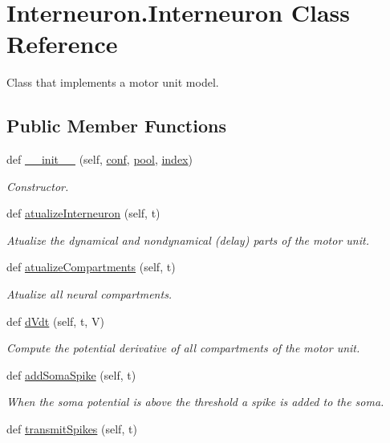 \hypertarget{class_interneuron_1_1_interneuron}{}\section{Interneuron.\+Interneuron Class Reference}
\label{class_interneuron_1_1_interneuron}


Class that implements a motor unit model.  


\subsection*{Public Member Functions}
\begin{DoxyCompactItemize}
\item 
def \hyperlink{class_interneuron_1_1_interneuron_a9550e1a9e62f415679fc7710db5c2a65}{\+\_\+\+\_\+init\+\_\+\+\_\+} (self, \hyperlink{class_interneuron_1_1_interneuron_a20078e4de62213b832ce7f1cf2c587c7}{conf}, \hyperlink{class_interneuron_1_1_interneuron_acc2d5c89c20fc2db87f7af1839069127}{pool}, \hyperlink{class_interneuron_1_1_interneuron_ab8834528a49b8be56d59e0afc97019c2}{index})
\begin{DoxyCompactList}\small\item\em Constructor. \end{DoxyCompactList}\item 
def \hyperlink{class_interneuron_1_1_interneuron_aaa557573420679f62247b6c6a3879f88}{atualize\+Interneuron} (self, t)
\begin{DoxyCompactList}\small\item\em Atualize the dynamical and nondynamical (delay) parts of the motor unit. \end{DoxyCompactList}\item 
def \hyperlink{class_interneuron_1_1_interneuron_aadb0a11834ebf0b9fb0fa05788da23d1}{atualize\+Compartments} (self, t)
\begin{DoxyCompactList}\small\item\em Atualize all neural compartments. \end{DoxyCompactList}\item 
def \hyperlink{class_interneuron_1_1_interneuron_a5eff07c93609a66a19f8e7426204be02}{d\+Vdt} (self, t, V)
\begin{DoxyCompactList}\small\item\em Compute the potential derivative of all compartments of the motor unit. \end{DoxyCompactList}\item 
def \hyperlink{class_interneuron_1_1_interneuron_affb57bbf0d7eec160855d0fce26f83d5}{add\+Soma\+Spike} (self, t)
\begin{DoxyCompactList}\small\item\em When the soma potential is above the threshold a spike is added to the soma. \end{DoxyCompactList}\item 
def \hyperlink{class_interneuron_1_1_interneuron_a776242a1aa83a264adba968651de0226}{transmit\+Spikes} (self, t)
\end{DoxyCompactItemize}
